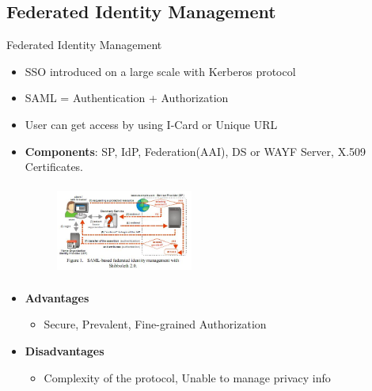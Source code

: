 \documentclass[10pt,xcolor=dvipsnames]{beamer}
\begin{document}
\subsection{Federated Identity Management}
\begin{frame}{Federated Identity Management}
\begin{itemize}
\item SSO introduced on a large scale with Kerberos protocol
\item SAML = Authentication + Authorization
\item User can get access by using I-Card or Unique URL
\item \textbf{Components}: SP, IdP, Federation(AAI), DS or WAYF Server, X.509 Certificates.
\begin{figure}
\includegraphics[width=4.5cm,height=3cm]{fidm}
\end{figure}
\item \textbf{Advantages}
\begin{itemize}
	\item Secure, Prevalent, Fine-grained Authorization
\end{itemize}
\item \textbf{Disadvantages}
\begin{itemize}
	\item Complexity of the protocol, Unable to manage privacy info
\end{itemize}
\end{itemize}
\end{frame}
\end{document}

